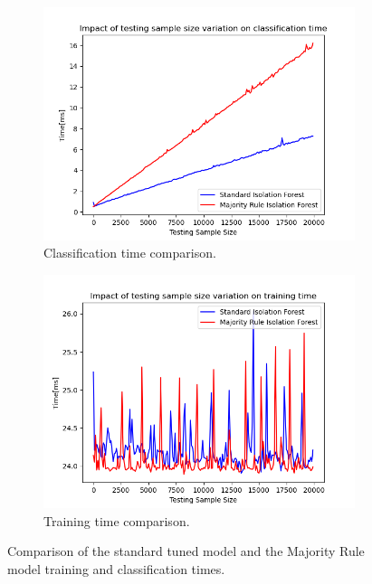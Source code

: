 \documentclass[futureinternet,article,submit,pdftex,moreauthors]{Definitions/mdpi}
\begin{document}
\begin{figure}[H]
	\centering
	\begin{subfigure}{0.45\textwidth}
		\centering
		\includegraphics[width=\textwidth]{img/classificationTimeComparison.png}
		\caption{Classification time comparison.}
		\label{fig:majority_rule_classification_time}
	\end{subfigure}
	\hfill
	\begin{subfigure}{0.45\textwidth}
		\centering
		\includegraphics[width=\textwidth]{img/trainingTimeComparison.png}
		\caption{Training time comparison.}
		\label{fig:majority_rule_training_time}
	\end{subfigure}
	\caption{Comparison of the standard tuned model and the Majority Rule model training and classification times.}
	\label{fig:majority_rule_time_comparison}
\end{figure}
\end{document}
